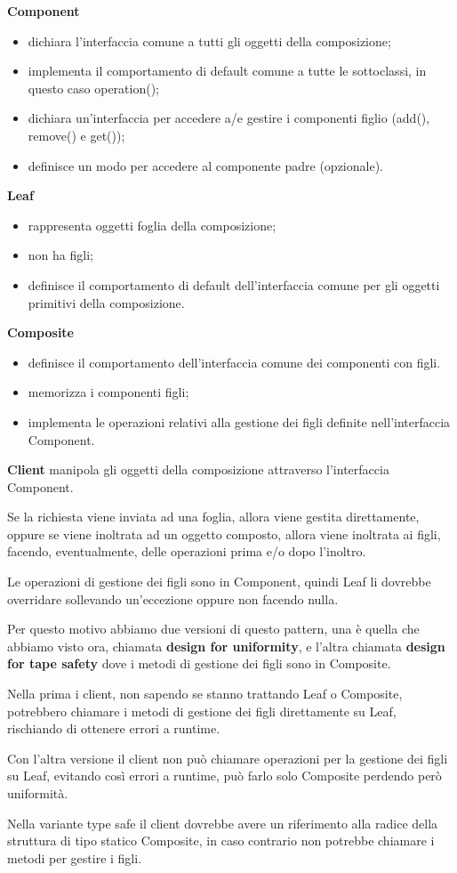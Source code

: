 \textbf{Component}
\begin{itemize}
    \item dichiara l’interfaccia comune a tutti gli oggetti della composizione;
    \item implementa il comportamento di default comune a tutte le sottoclassi, in questo caso operation();
    \item dichiara un’interfaccia per accedere a/e gestire i componenti figlio (add(), remove() e get());
    \item definisce un modo per accedere al componente padre (opzionale).
\end{itemize}

\textbf{Leaf}
\begin{itemize}
    \item rappresenta oggetti foglia della composizione;
    \item non ha figli;
    \item definisce il comportamento di default dell’interfaccia comune per gli oggetti primitivi della composizione.
\end{itemize} 

\textbf{Composite}
\begin{itemize}
    \item definisce il comportamento dell’interfaccia comune dei componenti con figli.
    \item memorizza i componenti figli;
    \item implementa le operazioni relativi alla gestione dei figli definite nell’interfaccia Component.
\end{itemize}

\textbf{Client} manipola gli oggetti della composizione attraverso l’interfaccia Component.
\medskip

Se la richiesta viene inviata ad una foglia, allora viene gestita direttamente, oppure se viene inoltrata ad un oggetto composto, allora viene inoltrata ai figli, 
facendo, eventualmente, delle operazioni prima e/o dopo l’inoltro.

Le operazioni di gestione dei figli sono in Component, quindi Leaf li dovrebbe overridare sollevando un'eccezione oppure non facendo nulla.

Per questo motivo abbiamo due versioni di questo pattern, una è quella che abbiamo visto ora, chiamata \textbf{design for uniformity}, e l'altra chiamata 
\textbf{design for tape safety} dove i metodi di gestione dei figli sono in Composite.

Nella prima i client, non sapendo se stanno trattando Leaf o Composite, potrebbero chiamare i metodi di gestione dei figli direttamente su Leaf, rischiando di 
ottenere errori a runtime.

Con l'altra versione il client non può chiamare operazioni per la gestione dei figli su Leaf, evitando così errori a runtime, può farlo solo Composite perdendo però 
uniformità.

Nella variante type safe il client dovrebbe avere un riferimento alla radice della struttura di tipo statico Composite, in caso contrario non potrebbe chiamare i 
metodi per gestire i figli.